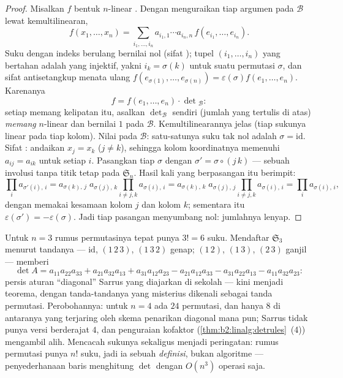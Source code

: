 \begin{proof}
Misalkan $f$ bentuk $n$-linear . Dengan menguraikan tiap
argumen pada $\mathcal{B}$ lewat kemultilinearan,
\[
f(x_1, \dots, x_n)
= \sum_{i_1, \dots, i_n} a_{i_1,1}\cdots a_{i_n,n}\,
f(e_{i_1}, \dots, e_{i_n}).
\]
Suku dengan indeks berulang bernilai nol (sifat ); tupel
$(i_1, \dots, i_n)$ yang bertahan adalah yang injektif, yakni $i_k =
\sigma(k)$ untuk suatu permutasi $\sigma$, dan sifat antisetangkup
menata ulang $f(e_{\sigma(1)}, \dots, e_{\sigma(n)}) = \varepsilon(\sigma)
f(e_1, \dots, e_n)$. Karenanya
\[
f = f(e_1, \dots, e_n) \cdot \det{}_{\mathcal{B}} :
\]
setiap  memang kelipatan itu, asalkan
$\det_{\mathcal{B}}$ sendiri (jumlah yang tertulis di atas)
\emph{memang} $n$-linear  dan bernilai $1$ pada $\mathcal B$.
Kemultilinearannya jelas (tiap sukunya linear pada tiap kolom).
Nilai pada $\mathcal B$: satu-satunya suku tak nol adalah $\sigma =
\mathrm{id}$. Sifat : andaikan $x_j = x_k$ ($j \neq k$),
sehingga kolom koordinatnya memenuhi $a_{i j} = a_{i k}$ untuk setiap
$i$. Pasangkan tiap $\sigma$ dengan $\sigma' = \sigma\circ(j\,k)$ ---
sebuah involusi tanpa titik tetap pada $\mathfrak{S}_n$. Hasil kali
yang berpasangan itu berimpit:
\[
\prod_i a_{\sigma'(i),\,i}
= a_{\sigma(k),\,j}\; a_{\sigma(j),\,k}
\prod_{i \neq j,k} a_{\sigma(i),\,i}
= a_{\sigma(k),\,k}\; a_{\sigma(j),\,j}
\prod_{i \neq j,k} a_{\sigma(i),\,i}
= \prod_i a_{\sigma(i),\,i},
\]
dengan memakai kesamaan kolom $j$ dan kolom $k$; sementara itu
$\varepsilon(\sigma') = -\varepsilon(\sigma)$. Jadi tiap pasangan
menyumbang nol: jumlahnya lenyap.
\end{proof}

\begin{example}\label{ex:b2:linalg:sarrus}
Untuk $n = 3$ rumus permutasinya tepat punya $3! = 6$ suku.
Mendaftar $\mathfrak{S}_3$ menurut tandanya ---
$\mathrm{id}$, $(1\,2\,3)$, $(1\,3\,2)$ genap;
$(1\,2)$, $(1\,3)$, $(2\,3)$ ganjil --- memberi
\[
\det A = a_{11}a_{22}a_{33} + a_{21}a_{32}a_{13} +
a_{31}a_{12}a_{23}
- a_{21}a_{12}a_{33} - a_{31}a_{22}a_{13} -
a_{11}a_{32}a_{23} :
\]
persis aturan ``diagonal'' Sarrus yang diajarkan di sekolah ---
kini menjadi teorema, dengan tanda-tandanya yang misterius dikenali
sebagai tanda permutasi. Perobohannya: untuk $n = 4$ ada $24$
permutasi, dan hanya $8$ di antaranya yang terjaring oleh skema
penarikan diagonal mana pun; Sarrus tidak punya versi berderajat $4$,
dan penguraian kofaktor (\cref{thm:b2:linalg:detrules}~(4)) mengambil
alih. Mencacah sukunya sekaligus menjadi peringatan: rumus permutasi
punya $n!$ suku, jadi ia sebuah \emph{definisi}, bukan
algoritme --- penyederhanaan baris menghitung $\det$ dengan $O(n^3)$
operasi saja.
\end{example}

